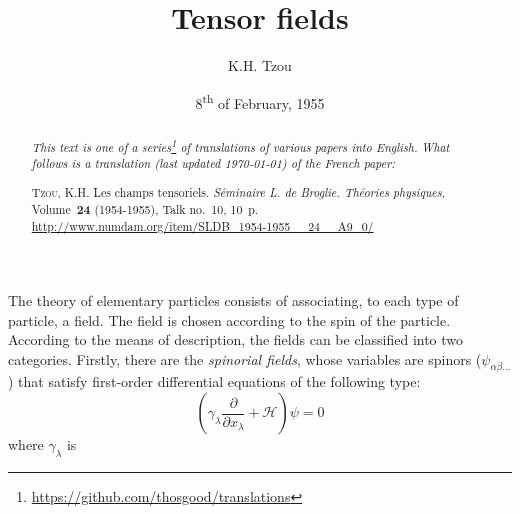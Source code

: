 \documentclass{article}
\newcommand{\ham}{\mathscr{H}}
\newcommand{\oldpage}[1]{\marginpar{\footnotesize$\Big\vert$ \textit{p.~#1}}}
\begin{document}
\renewcommand{\abstractname}{Translator's note.}

\title{Tensor fields}
\author{K.H. Tzou}
\date{8\textsuperscript{th} of February, 1955}
\maketitle

\begin{abstract}
  \renewcommand*{\thefootnote}{\fnsymbol{footnote}}
  \emph{This text is one of a series\footnote{\url{https://github.com/thosgood/translations}} of translations of various papers into English.}
  \emph{What follows is a translation (last updated \today) of the French paper:}

  \medskip\noindent
  \textsc{Tzou, K.H.} Les champs tensoriels. \emph{Séminaire L. de Broglie. Théories physiques}, Volume~\textbf{24} (1954-1955), Talk no.~10, 10~p. {\footnotesize\url{http://www.numdam.org/item/SLDB_1954-1955__24__A9_0/}}
\end{abstract}

\tableofcontents



\bigskip\bigskip
\oldpage{13-01}
The theory of elementary particles consists of associating, to each type of particle, a field.
The field is chosen according to the spin of the particle.
According to the means of description, the fields can be classified into two categories.
Firstly, there are the \emph{spinorial fields}, whose variables are spinors ($\psi_{\alpha\beta\ldots}$) that satisfy first-order differential equations of the following type:
\[
  \left(\gamma_\lambda \frac{\partial}{\partial x_\lambda} + \ham\right)\psi = 0
\]
where $\gamma_\lambda$ is
\end{document}
